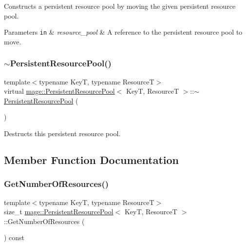 Constructs a persistent resource pool by moving the given persistent resource pool.


\begin{DoxyParams}[1]{Parameters}
\mbox{\tt in}  & {\em resource\+\_\+pool} & A reference to the persistent resource pool to move. \\
\hline
\end{DoxyParams}
\hypertarget{classmage_1_1_persistent_resource_pool_a3408c2feb02a1d3b13c16d889fc50709}{}\label{classmage_1_1_persistent_resource_pool_a3408c2feb02a1d3b13c16d889fc50709} 
\subsubsection{\texorpdfstring{$\sim$\+Persistent\+Resource\+Pool()}{~PersistentResourcePool()}}
{\footnotesize\ttfamily template$<$typename KeyT, typename ResourceT$>$ \\
virtual \hyperlink{classmage_1_1_persistent_resource_pool}{mage\+::\+Persistent\+Resource\+Pool}$<$ KeyT, ResourceT $>$\+::$\sim$\hyperlink{classmage_1_1_persistent_resource_pool}{Persistent\+Resource\+Pool} (\begin{DoxyParamCaption}{ }\end{DoxyParamCaption})\hspace{0.3cm}{\ttfamily [virtual]}}

Destructs this persistent resource pool. 

\subsection{Member Function Documentation}
\hypertarget{classmage_1_1_persistent_resource_pool_a16019bc52d2a9eca0d0e239aac4c0566}{}\label{classmage_1_1_persistent_resource_pool_a16019bc52d2a9eca0d0e239aac4c0566} 
\subsubsection{\texorpdfstring{Get\+Number\+Of\+Resources()}{GetNumberOfResources()}}
{\footnotesize\ttfamily template$<$typename KeyT, typename ResourceT$>$ \\
size\+\_\+t \hyperlink{classmage_1_1_persistent_resource_pool}{mage\+::\+Persistent\+Resource\+Pool}$<$ KeyT, ResourceT $>$\+::Get\+Number\+Of\+Resources (\begin{DoxyParamCaption}{ }\end{DoxyParamCaption}) const}


